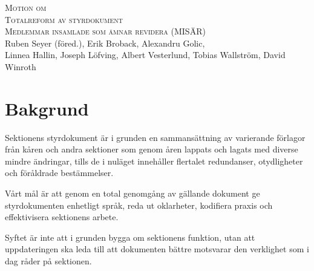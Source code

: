 \documentclass{article}
\newcommand{\motionsnamn}{Totalreform av styrdokument}
\newcommand{\motionar}{Medlemmar insamlade som ämnar revidera (MISÄR)}
\begin{document}
\begin{center}
\textsc{\Huge Motion om}\\[0.5cm]
\textsc{\huge \motionsnamn}\\[0.5cm]
\textsc{\large \motionar\\}
Ruben Seyer (föred.),
Erik Broback,
Alexandru Golic,\\
Linnea Hallin,
Joseph Löfving,
Albert Vesterlund,
Tobias Wallström,
David Winroth
\end{center}

\section*{Bakgrund}
Sektionens styrdokument är i grunden en sammansättning av varierande förlagor från kåren och andra sektioner som genom åren lappats och lagats med diverse mindre ändringar, tills de i nuläget innehåller flertalet redundanser, otydligheter och föråldrade bestämmelser.

Vårt mål är att genom en total genomgång av gällande dokument ge styrdokumenten enhetligt språk, reda ut oklarheter, kodifiera praxis och effektivisera sektionens arbete.

Syftet är inte att i grunden bygga om sektionens funktion, utan att uppdateringen ska leda till att dokumenten bättre motsvarar den verklighet som i dag råder på sektionen.
\end{document}
